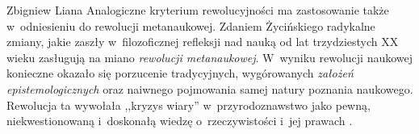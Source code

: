 \begin{artplenv}{Zbigniew Liana}
Analogiczne kryterium rewolucyjności ma zastosowanie także w~odniesieniu do rewolucji metanaukowej. Zdaniem Życińskiego
\parencites*[s.~126]{zycinski_elementy_1996}[por.][s.~101]{zycinski_jezyk_1983}
radykalne zmiany, jakie zaszły w~filozoficznej refleksji nad
nauką od lat trzydziestych XX wieku zasługują na miano \textit{rewolucji metanaukowej}. W~wyniku rewolucji naukowej
konieczne okazało się porzucenie tradycyjnych, wygórowanych \textit{założeń epistemologicznych} oraz naiwnego pojmowania
samej natury poznania naukowego. Rewolucja ta wywołała ,,kryzys wiary'' w~przyrodoznawstwo jako pewną, niekwestionowaną i~doskonałą
wiedzę o~rzeczywistości i~jej prawach
\parencite[zob.][s.~102]{zycinski_jezyk_1983}.


\end{artplenv}
